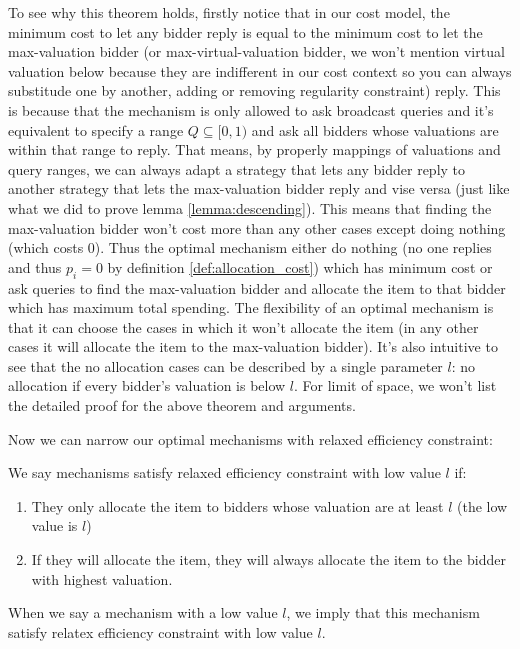 To see why this theorem holds, firstly notice that in our cost model, the
minimum cost to let any bidder reply is equal to the minimum cost to let the
max-valuation bidder (or max-virtual-valuation bidder, we won't mention virtual
valuation below because they are indifferent in our cost context so you can
always substitude one by another, adding or removing regularity constraint)
reply.  This is because that the mechanism is only allowed to ask broadcast
queries and it's equivalent to specify a range $Q \subseteq [0, 1)$ and ask all
bidders whose valuations are within that range to reply. That means, by
properly mappings of valuations and query ranges, we can always adapt a
strategy that lets any bidder reply to another strategy that lets the
max-valuation bidder reply and vise versa (just like what we did to prove lemma
\ref{lemma:descending}). This means that finding the max-valuation bidder won't
cost more than any other cases except doing nothing (which costs $0$). Thus the
optimal mechanism either do nothing (no one replies and thus $p_i = 0$ by
definition \ref{def:allocation_cost}) which has minimum cost or ask queries to
find the max-valuation bidder and allocate the item to that bidder which has
maximum total spending.  The flexibility of an optimal mechanism is that it can
choose the cases in which it won't allocate the item (in any other cases it
will allocate the item to the max-valuation bidder). It's also intuitive
to see that the no allocation cases can be described by a single parameter $l$:
no allocation if every bidder's valuation is below $l$. For limit of space,
we won't list the detailed proof for the above theorem and arguments.

Now we can narrow our optimal mechanisms with relaxed efficiency constraint:

\begin{definition}

We say mechanisms satisfy relaxed efficiency constraint with low value $l$
if:

    \begin{enumerate}

    \item They only allocate the item to bidders whose valuation are at least
    $l$ (the low value is $l$)

    \item If they will allocate the item, they will always allocate the item to
    the bidder with highest valuation.

    \end{enumerate}

When we say a mechanism with a low value $l$, we imply that this mechanism
satisfy relatex efficiency constraint with low value $l$.

\end{definition}


